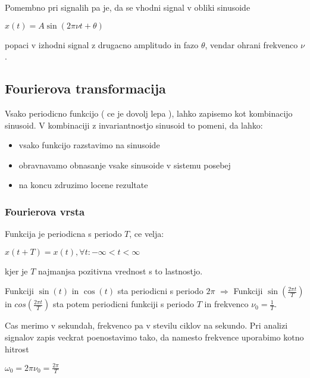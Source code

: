 \documentclass{article}
\begin{document}
\begin{multicols}{4}
Pomembno pri signalih pa je, da se vhodni signal v obliki sinusoide
\begin{center}
    \begin{math}
        x(t) = A \sin (2 \pi \nu t + \theta)
    \end{math}
\end{center}
popaci v izhodni signal z drugacno amplitudo in fazo $\theta$, vendar ohrani frekvenco $\nu$.

\subsection{Fourierova transformacija}
Vsako periodicno funkcijo ( ce je dovolj lepa ), lahko zapisemo kot kombinacijo sinusoid.
V kombinaciji z invariantnostjo sinusoid to pomeni, da lahko:
\begin{itemize}
    \item vsako funkcijo razstavimo na sinusoide
    \item obravnavamo obnasanje vsake sinusoide v sistemu posebej
    \item na koncu zdruzimo locene rezultate
\end{itemize}

\subsubsection{Fourierova vrsta}
Funkcija je periodicna s periodo $T$, ce velja:
\begin{center}
    \begin{math}
        x(t + T) = x(t), \forall t: -\infty < t < \infty
    \end{math}
\end{center}
kjer je $T$ najmanjsa pozitivna vrednost s to lastnostjo.

Funkciji $\sin(t)$ in $\cos(t)$ sta periodicni s periodo $2\pi$  $\Rightarrow$
Funkciji $\sin(\frac{2 \pi t}{T})$ in $cos(\frac{2 \pi t}{T})$ sta potem periodicni funkciji 
s periodo $T$ in frekvenco $\nu_0 = \frac{1}{T}$.

Cas merimo v sekundah, frekvenco pa v stevilu ciklov na sekundo. Pri analizi
signalov zapis veckrat poenostavimo tako, da namesto frekvence uporabimo kotno hitrost
\begin{center}
    \begin{math}
        \omega_0 = 2 \pi \nu_0 = \frac{2\pi}{T}
    \end{math}
\end{center}


\end{multicols}
\end{document}
